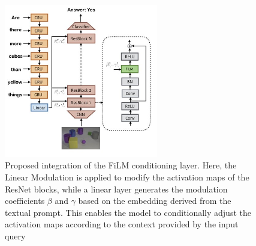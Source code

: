 \begin{figure}[t]
    \centering
    \includegraphics[width=0.6\textwidth]{figures/images/ch2/film_architecture.jpg}
    \caption{Proposed integration of the FiLM conditioning layer. Here, the Linear Modulation is applied to modify the activation maps of the ResNet blocks, while a linear layer generates the modulation coefficients $\beta$ and $\gamma$ based on the embedding derived from the textual prompt. This enables the model to conditionally adjust the activation maps according to the context provided by the input query}
    \label{fig:film_architecture}
\end{figure}
